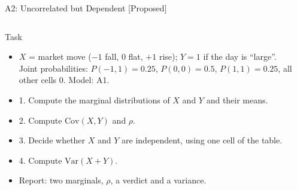 \begin{frame}{A2: Uncorrelated but Dependent [Proposed]}
\propsub
\itemsize{\scriptsize}
\begin{columns}[T]
\begin{column}{\taskw}
\begin{block}{Task}
\begin{itemize}
    \item $X$ = market move ($-1$ fall, $0$ flat, $+1$ rise); $Y = 1$ if the day is ``large''. Joint probabilities: $P(-1, 1) = 0.25$, $P(0, 0) = 0.5$, $P(1, 1) = 0.25$, all other cells 0. Model: A1.
    \item 1. Compute the marginal distributions of $X$ and $Y$ and their means.
    \item 2. Compute $\text{Cov}(X, Y)$ and $\rho$.
    \item 3. Decide whether $X$ and $Y$ are independent, using one cell of the table.
    \item 4. Compute $\text{Var}(X + Y)$.
    \item Report: two marginals, $\rho$, a verdict and a variance.
\end{itemize}
\end{block}
\end{column}
\begin{column}{\solw}
\end{column}
\end{columns}
\end{frame}

